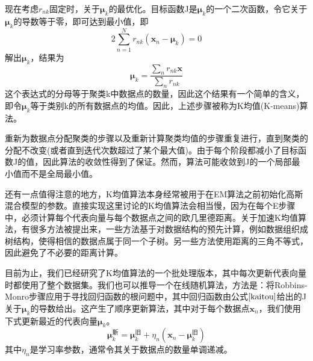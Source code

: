 现在考虑$r_{nk}$固定时，关于$\boldsymbol{\mu}_k$的最优化。目标函数J是$\boldsymbol{\mu}_k$的一个二次函数，令它关于$\boldsymbol{\mu}_k$的导数等于零，即可达到最小值，即
\begin{equation}
	2\sum_{n=1}^{N}r_{nk}(\boldsymbol{x}_n-\boldsymbol{\mu}_k)=0
\end{equation}
解出$\boldsymbol{\mu}_k$，结果为
\begin{equation}
	\boldsymbol{\mu}_k=\frac{\sum_n r_{nk}\boldsymbol{x}}{\sum_n r_{nk}}
\end{equation}
这个表达式的分母等于聚类k中数据点的数量，因此这个结果有一个简单的含义，即令$\boldsymbol{\mu}_k$等于类别k的所有数据点的均值。因此，上述步骤被称为K均值(K-means)算法。

重新为数据点分配聚类的步骤以及重新计算聚类均值的步骤重复进行，直到聚类的分配不改变(或者直到迭代次数超过了某个最大值)。由于每个阶段都减小了目标函数J的值，因此算法的收敛性得到了保证。然而，算法可能收敛到J的一个局部最小值而不是全局最小值。

还有一点值得注意的地方，K均值算法本身经常被用于在EM算法之前初始化高斯混合模型的参数。直接实现这里讨论的K均值算法会相当慢，因为在每个E步骤中，必须计算每个代表向量与每个数据点之间的欧几里德距离。关于加速K均值算法，有很多方法被提出来，一些方法基于对数据结构的预先计算，例如数据组织成树结构，使得相信的数据点属于同一个子树。另一些方法使用距离的三角不等式，因此避免了不必要的距离计算。

目前为止，我们已经研究了K均值算法的一个批处理版本，其中每次更新代表向量时都使用了整个数据集。我们也可以推导一个在线随机算法，方法是：将Robbins-Monro步骤应用于寻找回归函数的根问题中，其中回归函数由公式$\ref{kaitou}$给出的J关于$\boldsymbol{\mu}_k$的导数给出。这产生了顺序更新算法，其中对于每个数据点$\boldsymbol{x}_n$，我们使用下式更新最近的代表向量$\boldsymbol{\mu}_k$。
\begin{equation}
	\boldsymbol{\mu}_k^{\text{新}}=\boldsymbol{\mu}_k^{\text{旧}}+\eta_n(\boldsymbol{x}_n-\boldsymbol{\mu}_k^{\text{旧}})
\end{equation}
其中$\eta_n$是学习率参数，通常令其关于数据点的数量单调递减。